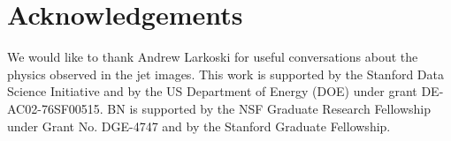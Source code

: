 \section{Acknowledgements} %
\label{sec:acknowledgements}

We would like to thank Andrew Larkoski for useful conversations about the physics observed in the jet images.  This work is supported by the Stanford Data Science Initiative and by the US Department of Energy (DOE) under grant DE-AC02-76SF00515. BN is supported by the NSF Graduate Research Fellowship under Grant No. DGE-4747 and by the Stanford Graduate Fellowship.  

